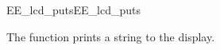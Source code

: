 %  
%  
%  
%  



\begin{function_nopb2}{EE\_lcd\_puts}{EE_lcd_puts}
  
  \begin{fundescription}
    The function prints a string to the display.
  \end{fundescription}
  
  \begin{funparameters}
  \end{funparameters}
  
  
\end{function_nopb2}


